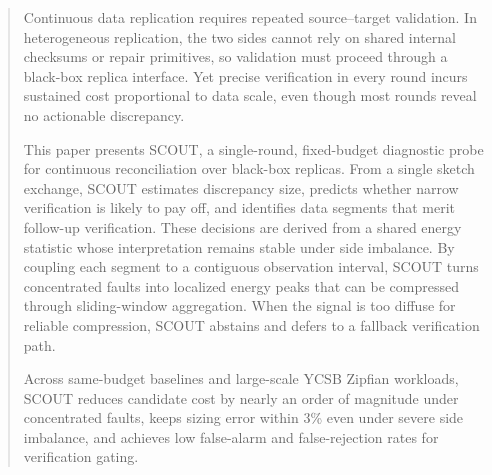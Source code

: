 \begin{abstract}
Continuous data replication requires repeated source--target validation. In heterogeneous replication, the two sides cannot rely on shared internal checksums or repair primitives, so validation must proceed
through a black-box replica interface. Yet precise verification in every round incurs sustained cost proportional to data scale, even though most rounds reveal no actionable discrepancy.

This paper presents SCOUT, a single-round, fixed-budget diagnostic probe for continuous reconciliation over black-box replicas. From a single sketch exchange, SCOUT estimates discrepancy size, predicts whether
 narrow verification is likely to pay off, and identifies data segments that merit follow-up verification. These decisions are derived from a shared energy statistic whose interpretation remains stable under side imbalance. By
coupling each segment to a contiguous observation interval, SCOUT turns concentrated faults into localized energy peaks that can be compressed through sliding-window aggregation. When the signal is too diffuse for reliable compression,
SCOUT abstains and defers to a fallback verification path.

Across same-budget baselines and large-scale YCSB Zipfian workloads, SCOUT reduces candidate cost by nearly an order of magnitude under concentrated faults, keeps sizing error within 3\% even under severe side
 imbalance, and achieves low false-alarm and false-rejection rates for verification gating.
\end{abstract}
